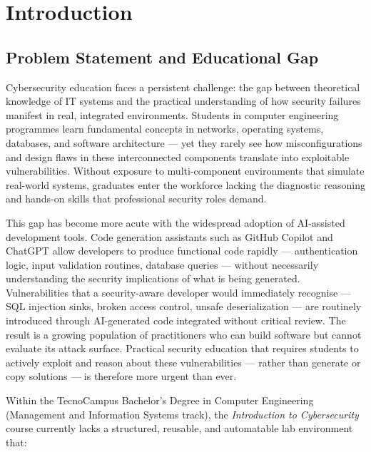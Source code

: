 
\chapter{Introduction}

\section{Problem Statement and Educational Gap}

Cybersecurity education faces a persistent challenge: the gap between theoretical
knowledge of IT systems and the practical understanding of how security failures
manifest in real, integrated environments. Students in computer engineering programmes
learn fundamental concepts in networks, operating systems, databases, and software
architecture --- yet they rarely see how misconfigurations and design flaws
in these interconnected components translate into exploitable vulnerabilities.
Without exposure to multi-component environments that simulate real-world systems,
graduates enter the workforce lacking the diagnostic reasoning and hands-on skills
that professional security roles demand.

This gap has become more acute with the widespread adoption of AI-assisted development
tools. Code generation assistants such as GitHub Copilot and ChatGPT allow developers
to produce functional code rapidly --- authentication logic, input validation routines,
database queries --- without necessarily understanding the security implications of what
is being generated. Vulnerabilities that a security-aware developer would immediately
recognise --- SQL injection sinks, broken access control, unsafe deserialization ---
are routinely introduced through AI-generated code integrated without critical review.
The result is a growing population of practitioners who can build software but cannot
evaluate its attack surface. Practical security education that requires students to
actively exploit and reason about these vulnerabilities --- rather than generate or
copy solutions --- is therefore more urgent than ever.

Within the TecnoCampus Bachelor's Degree in Computer Engineering
(Management and Information Systems track), the \textit{Introduction to Cybersecurity}
course currently lacks a structured, reusable, and automatable lab environment that:

